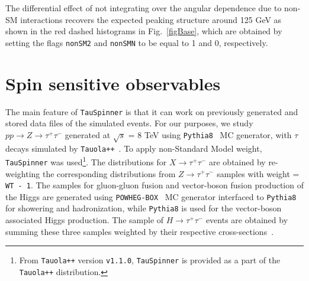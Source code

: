 \documentclass[12pt]{article}
\begin{document}
The differential effect of not integrating over the angular dependence due to non-SM interactions 
recovers the expected peaking structure around 125 GeV as shown in the red dashed histograms in Fig.~\ref{figBase},
which are obtained by setting the flags {\tt nonSM2} and {\tt nonSMN} to be equal to 1 and 0, respectively.

\section{Spin sensitive observables}

The main feature of {\tt TauSpinner} is that it can work on previously generated and stored data files of the simulated events.
For our purposes, we  study $pp \to Z \to \tau^+ \tau^-$ 
generated at $\sqrt{s}$ = 8 TeV using {\tt Pythia8}~\cite{Sjostrand:2007gs} MC generator, with $\tau$ decays simulated by {\tt Tauola++}~\cite{Davidson:2010rw}.
To apply non-Standard Model weight, 
{\tt TauSpinner} was used\footnote{From {\tt Tauola++} version {\tt v1.1.0}, {\tt TauSpinner} is provided as a part of the {\tt Tauola++} distribution.}.
The distributions for $X\to\tau^+\tau^-$ are obtained by re-weighting the corresponding distributions from $Z\to\tau^+\tau^-$ samples with weight = {\tt WT - 1}.
The samples for gluon-gluon fusion and vector-boson fusion production of the Higgs are generated 
using {\tt POWHEG-BOX}~\cite{Alioli:2008tz,Nason:2009ai} MC generator interfaced to {\tt Pythia8} for showering and hadronization,
while {\tt Pythia8}  is used for the  vector-boson associated Higgs production.
The sample of $H\to\tau^+\tau^-$ events are obtained by summing these three samples 
weighted by their respective cross-sections~\cite{LHCHiggsCrossSectionWorkingGroup:2011ti, LHCHiggsCrossSectionWorkingGroup:2012vm}.
\end{document}
